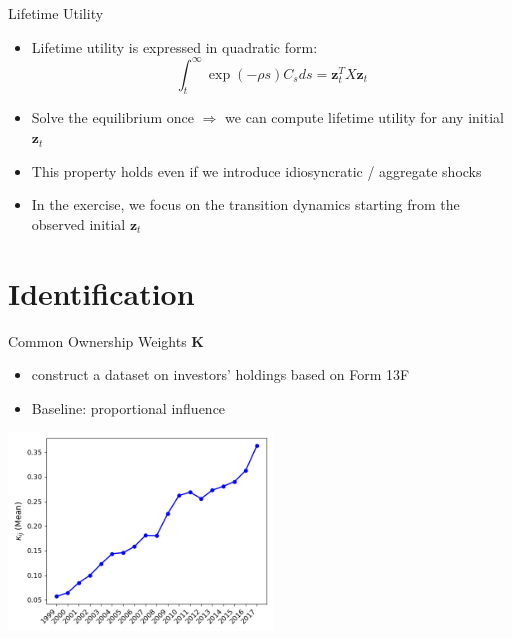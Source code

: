 \documentclass[
  10pt,
  aspectratio=169,   %
]{beamer}
\theoremstyle{plain}
\begin{document}
\begin{frame}{Lifetime Utility}

  \label{aggregation}
  \begin{itemize}
    \item Lifetime utility is expressed in quadratic form:
          \[
            \int_{t}^{\infty}\exp\left(-\rho s\right)C_{s}ds=\bm{z}_{t}^{T}X\bm{z}_{t}
          \]

          \hyperlink{X}{}
    \item Solve the equilibrium once $\Longrightarrow$ we can compute lifetime utility for any initial $\bm{z}_{t}$
          \medskip{}
    \item This property holds even if we introduce idiosyncratic / aggregate shocks
          \medskip{}
    \item In the exercise, we focus on the transition dynamics starting from the observed initial $\bm{z}_{t}$
  \end{itemize}
\end{frame}

\section{Identification}

\begin{frame}{Common Ownership Weights $\bm{K}$}
  \begin{itemize}
    \item \citet{Backus2021-yt} construct a dataset on investors' holdings based on Form 13F
    \item Baseline: proportional influence \citep{Rotemberg1984-jz} \hfill\hyperlink{rotemberg}{}
  \end{itemize}
  \begin{center}
    \includegraphics[width=7cm]{figures/kappa}
  \end{center}
\end{frame}
\end{document}
